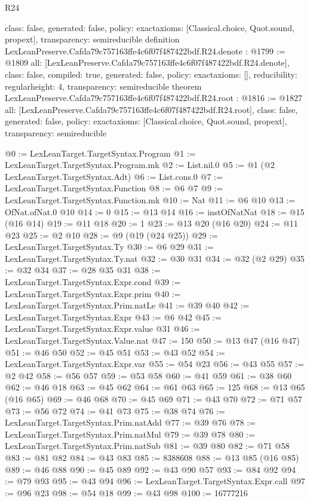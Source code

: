 \begin{lexlean}{R24}
\begin{coremodule}
{  class: false,
  generated: false,
  policy: exact{axioms: [Classical.choice, Quot.sound, propext]},
  transparency: semireducible
}
definition LexLeanPreserve.Cafda79c757163ffe4c6f07f487422bdf.R24.denote : @1799 := @1809 {
  all: [LexLeanPreserve.Cafda79c757163ffe4c6f07f487422bdf.R24.denote],
  class: false,
  compiled: true,
  generated: false,
  policy: exact{axioms: []},
  reducibility: regular{height: 4},
  transparency: semireducible
}
theorem LexLeanPreserve.Cafda79c757163ffe4c6f07f487422bdf.R24.root : @1816 := @1827 {
  all: [LexLeanPreserve.Cafda79c757163ffe4c6f07f487422bdf.R24.root],
  class: false,
  generated: false,
  policy: exact{axioms: [Classical.choice, Quot.sound, propext]},
  transparency: semireducible
}

@0 := LexLeanTarget.TargetSyntax.Program
@1 := LexLeanTarget.TargetSyntax.Program.mk
@2 := List.nil.{0}
@5 := @1 (@2 LexLeanTarget.TargetSyntax.Adt)
@6 := List.cons.{0}
@7 := LexLeanTarget.TargetSyntax.Function
@8 := @6 @7
@9 := LexLeanTarget.TargetSyntax.Function.mk
@10 := Nat
@11 := @6 @10
@13 := OfNat.ofNat.{0} @10
@14 := 0
@15 := @13 @14
@16 := instOfNatNat
@18 := @15 (@16 @14)
@19 := @11 @18
@20 := 1
@23 := @13 @20 (@16 @20)
@24 := @11 @23
@25 := @2 @10
@28 := @9 (@19 (@24 @25))
@29 := LexLeanTarget.TargetSyntax.Ty
@30 := @6 @29
@31 := LexLeanTarget.TargetSyntax.Ty.nat
@32 := @30 @31
@34 := @32 (@2 @29)
@35 := @32 @34
@37 := @28 @35 @31
@38 := LexLeanTarget.TargetSyntax.Expr.cond
@39 := LexLeanTarget.TargetSyntax.Expr.prim
@40 := LexLeanTarget.TargetSyntax.Prim.natLe
@41 := @39 @40
@42 := LexLeanTarget.TargetSyntax.Expr
@43 := @6 @42
@45 := LexLeanTarget.TargetSyntax.Expr.value @31
@46 := LexLeanTarget.TargetSyntax.Value.nat
@47 := 150
@50 := @13 @47 (@16 @47)
@51 := @46 @50
@52 := @45 @51
@53 := @43 @52
@54 := LexLeanTarget.TargetSyntax.Expr.var
@55 := @54 @23
@56 := @43 @55
@57 := @2 @42
@58 := @56 @57
@59 := @53 @58
@60 := @41 @59
@61 := @38 @60
@62 := @46 @18
@63 := @45 @62
@64 := @61 @63
@65 := 125
@68 := @13 @65 (@16 @65)
@69 := @46 @68
@70 := @45 @69
@71 := @43 @70
@72 := @71 @57
@73 := @56 @72
@74 := @41 @73
@75 := @38 @74
@76 := LexLeanTarget.TargetSyntax.Prim.natAdd
@77 := @39 @76
@78 := LexLeanTarget.TargetSyntax.Prim.natMul
@79 := @39 @78
@80 := LexLeanTarget.TargetSyntax.Prim.natSub
@81 := @39 @80
@82 := @71 @58
@83 := @81 @82
@84 := @43 @83
@85 := 8388608
@88 := @13 @85 (@16 @85)
@89 := @46 @88
@90 := @45 @89
@92 := @43 @90 @57
@93 := @84 @92
@94 := @79 @93
@95 := @43 @94
@96 := LexLeanTarget.TargetSyntax.Expr.call
@97 := @96 @23
@98 := @54 @18
@99 := @43 @98
@100 := 16777216

\end{coremodule}
\end{lexlean}
